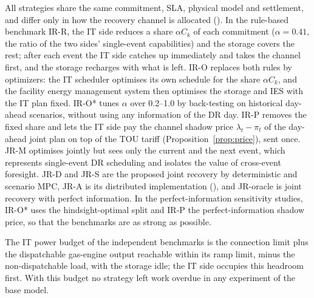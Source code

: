 All strategies share the same commitment, SLA, physical model and settlement, and differ only in how the recovery
channel is allocated (). In the rule-based benchmark IR-R, the IT side reduces a share
$\alpha C_k$ of each commitment ($\alpha=0.41$, the ratio of the two sides' single-event capabilities) and the storage
covers the rest; after each event the IT side catches up immediately and takes the channel first, and the storage
recharges with what is left. IR-O replaces both rules by optimizers: the IT scheduler optimises its own schedule for
the share $\alpha C_k$, and the facility energy management system then optimises the storage and IES with the IT plan
fixed. IR-O* tunes $\alpha$ over 0.2--1.0 by back-testing on historical day-ahead scenarios, without using any
information of the DR day. IR-P removes the fixed share and lets the IT side pay the channel shadow price
$\lambda_t-\pi_t$ of the day-ahead joint plan on top of the TOU tariff (Proposition~\ref{prop:price}), sent once. JR-M
optimises jointly but sees only the current and the next event, which represents single-event DR scheduling and
isolates the value of cross-event foresight. JR-D and JR-S are the proposed joint recovery by deterministic and scenario
MPC, JR-A is its distributed implementation (), and JR-oracle is joint recovery with perfect
information. In the perfect-information sensitivity studies, IR-O* uses the hindsight-optimal split and IR-P the
perfect-information shadow price, so that the benchmarks are as strong as possible.

The IT power budget of the independent benchmarks is the connection limit plus the dispatchable gas-engine output
reachable within its ramp limit, minus the non-dispatchable load, with the storage idle; the IT side occupies this
headroom first. With this budget no strategy left work overdue in any experiment of the base model.

